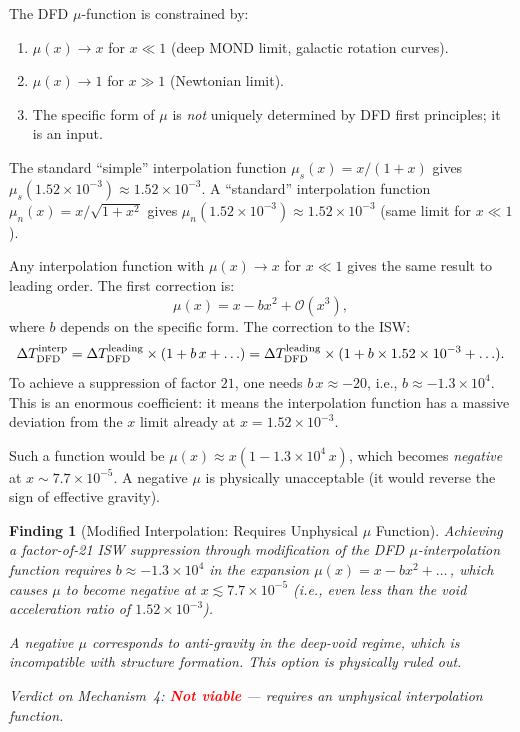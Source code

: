 \documentclass[11pt]{article}
\newtheorem{finding}{Finding}
\newcommand{\ee}[1]{\times 10^{#1}}
\newcommand{\order}[1]{\mathcal{O}(#1)}
\newcommand{\DFD}{{\rm DFD}}
\newcommand{\deltaT}{\Delta T}
\begin{document}
The DFD $\mu$-function is constrained by:
\begin{enumerate}[label=(\alph*)]
  \item $\mu(x) \to x$ for $x \ll 1$ (deep MOND limit, galactic rotation curves).
  \item $\mu(x) \to 1$ for $x \gg 1$ (Newtonian limit).
  \item The specific form of $\mu$ is \emph{not} uniquely determined by
    DFD first principles; it is an input.
\end{enumerate}
The standard ``simple'' interpolation function $\mu_s(x) = x/(1+x)$
gives $\mu_s(1.52\ee{-3}) \approx 1.52\ee{-3}$.  A ``standard''
interpolation function $\mu_n(x) = x/\sqrt{1+x^2}$ gives
$\mu_n(1.52\ee{-3}) \approx 1.52\ee{-3}$ (same limit for $x \ll 1$).

Any interpolation function with $\mu(x) \to x$ for $x \ll 1$ gives
the same result to leading order.  The first correction is:
\begin{equation}
  \mu(x) = x - bx^2 + \order{x^3},
\end{equation}
where $b$ depends on the specific form.  The correction to the ISW:
\[
  \deltaT_{\DFD}^{\rm interp}
  = \deltaT_{\DFD}^{\rm leading}\times(1 + b\,x + \ldots)
  = \deltaT_{\DFD}^{\rm leading}\times(1 + b\times 1.52\ee{-3} + \ldots).
\]
To achieve a suppression of factor $21$, one needs $b\,x \approx -20$,
i.e., $b \approx -1.3\ee{4}$.  This is an enormous coefficient: it
means the interpolation function has a massive deviation from the $x$
limit already at $x = 1.52\ee{-3}$.

Such a function would be $\mu(x) \approx x(1 - 1.3\ee{4}\,x)$, which
becomes \emph{negative} at $x \sim 7.7\ee{-5}$.  A negative $\mu$
is physically unacceptable (it would reverse the sign of effective gravity).

\begin{finding}[Modified Interpolation: Requires Unphysical $\mu$ Function]\label{find:interp}
Achieving a factor-of-21 ISW suppression through modification of the
DFD $\mu$-interpolation function requires $b \approx -1.3\ee{4}$ in
the expansion $\mu(x) = x - bx^2 + \ldots$\,, which causes $\mu$ to
become negative at $x \lesssim 7.7\ee{-5}$ (i.e., even less than the
void acceleration ratio of $1.52\ee{-3}$).

A negative $\mu$ corresponds to anti-gravity in the deep-void regime,
which is incompatible with structure formation.  This option is
\textit{physically ruled out}.

\textit{Verdict on Mechanism~4:} \textcolor{red}{\textbf{Not viable}} ---
requires an unphysical interpolation function.
\end{finding}
\end{document}
